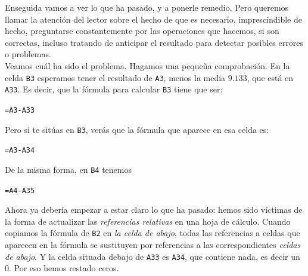 \documentclass[10pt,a4paper]{article}\usepackage[]{graphicx}\usepackage[]{color}
\newcounter {cont01}
\begin{document}
Enseguida vamos a ver lo que ha pasado, y a ponerle remedio. Pero queremos llamar la atención del lector sobre el hecho de que es necesario, imprescindible de hecho, preguntarse constantemente por las operaciones que hacemos, si son correctas, incluso tratando de anticipar el resultado para detectar posibles errores o problemas.\\

Veamos cuál ha sido el problema. Hagamos una pequeña comprobación. En la celda {\tt B3} esperamos tener el resultado de {\tt A3}, menos la media $9.133$, que está en {\tt A33}. Es decir, que la fórmula para calcular {\tt B3} tiene que ser:
\begin{center}
{\tt =A3-A33}
\end{center}
Pero si te sitúas en {\tt B3}, verás que la fórmula que aparece en esa celda es:
\begin{center}
{\tt =A3-A34}
\end{center}
De la misma forma, en {\tt B4} tenemos
\begin{center}
{\tt =A4-A35}
\end{center}
Ahora ya debería empezar a estar claro lo que ha pasado: hemos sido víctimas de la forma de actualizar las {\em referencias relativas} en una hoja de cálculo. Cuando copiamos la fórmula de {\tt B2} en {\em la celda de abajo}, todas las referencias a celdas que aparecen en la fórmula se sustituyen por referencias a las correspondientes {\em celdas de abajo}. Y la celda situada debajo de {\tt A33} es {\tt A34}, que contiene nada, es decir un 0. Por eso hemos restado ceros.
\end{document}
